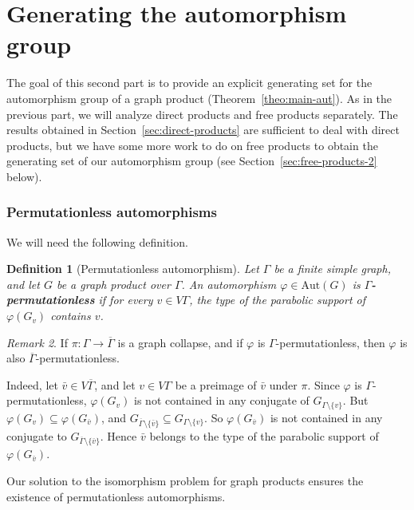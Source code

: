\documentclass[a4paper,english,11pt]{article}
\newtheorem{de}{Definition}[section]
\theoremstyle{definition}
\theoremstyle{remark}
\newtheorem{rk}[de]{Remark}
\newcommand{\Aut}{\mathrm{Aut}}
\newcommand{\deffont}[1]{\textbf{#1}}
\begin{document}
\part{Generating the automorphism group} \label{part:automorphisms}
The goal of this second part is to provide an explicit generating set for the automorphism group of a graph product (Theorem~\ref{theo:main-aut}). As in the previous part, we will analyze direct products and free products separately. The results obtained in Section~\ref{sec:direct-products} are sufficient to deal with direct products, but we have some more work to do on free products to obtain the generating set of our automorphism group (see Section~\ref{sec:free-products-2} below).

\section{Permutationless automorphisms}\label{sec:permutationless}

We will need the following definition.

\begin{de}[Permutationless automorphism]
Let $\Gamma$ be a finite simple graph, and let $G$ be a graph product over $\Gamma$. An automorphism $\varphi\in\Aut(G)$ is \deffont{$\Gamma$-permutationless} if for every $v\in V\Gamma$, the type of the parabolic support of $\varphi(G_v)$ contains $v$.
\end{de}

\begin{rk}\label{rk:permutationless-collapse}
If $\pi:\Gamma\to\overline{\Gamma}$ is a graph collapse, and if $\varphi$ is $\Gamma$-permutationless, then $\varphi$ is also $\overline\Gamma$-permutationless.

Indeed, let $\bar v\in V\overline{\Gamma}$, and let $v\in V\Gamma$ be a preimage of $\bar v$ under $\pi$. Since $\varphi$ is $\Gamma$-permutationless, $\varphi(G_v)$ is not contained in any conjugate of $G_{\Gamma\setminus\{v\}}$. But $\varphi(G_v)\subseteq\varphi(G_{\bar v})$, and $G_{\overline{\Gamma}\setminus\{\bar v\}}\subseteq G_{\Gamma\setminus\{v\}}$. So $\varphi(G_{\bar v})$ is not contained in any conjugate to $G_{\overline{\Gamma}\setminus\{\bar v\}}$. Hence $\bar v$ belongs to the type of the parabolic support of $\varphi(G_{\bar v})$.
\end{rk}

Our solution to the isomorphism problem for graph products ensures the existence of permutationless automorphisms.
\end{document}

